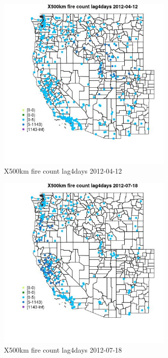 \begin{figure} 
\centering  
\includegraphics[width=0.77\textwidth]{Code_Outputs/Report_ML_input_PM25_Step4_part_e_de_duplicated_aves_compiled_2019-05-14wNAs_MapObsX500km_fire_count_lag4days2012-04-12.jpg} 
\caption{\label{fig:Report_ML_input_PM25_Step4_part_e_de_duplicated_aves_compiled_2019-05-14wNAsMapObsX500km_fire_count_lag4days2012-04-12}X500km fire count lag4days 2012-04-12} 
\end{figure} 
 

\begin{figure} 
\centering  
\includegraphics[width=0.77\textwidth]{Code_Outputs/Report_ML_input_PM25_Step4_part_e_de_duplicated_aves_compiled_2019-05-14wNAs_MapObsX500km_fire_count_lag4days2012-07-18.jpg} 
\caption{\label{fig:Report_ML_input_PM25_Step4_part_e_de_duplicated_aves_compiled_2019-05-14wNAsMapObsX500km_fire_count_lag4days2012-07-18}X500km fire count lag4days 2012-07-18} 
\end{figure} 
 


